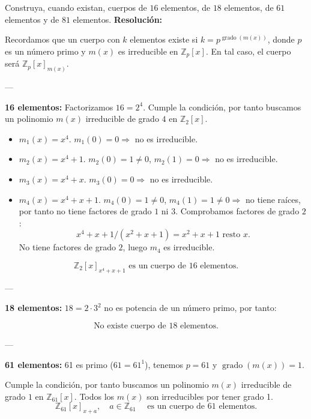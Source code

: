 \documentclass[a4paper,12pt]{article}
\begin{document}
\begin{ejercicio}[title=Ejercicio 60]
Construya, cuando existan, cuerpos de $16$ elementos, de $18$ elementos, de $61$ elementos y de $81$ elementos.
\tcblower
\textbf{Resolución:}

Recordamos que un cuerpo con $k$ elementos existe si $k = p^{\operatorname{grado}(m(x))}$, donde $p$ es un número primo y $m(x)$ es irreducible en $\mathbb{Z}_p[x]$.  
En tal caso, el cuerpo será $\mathbb{Z}_p[x]_{m(x)}$.

---

\textbf{16 elementos:}  
Factorizamos $16 = 2^4$. Cumple la condición, por tanto buscamos un polinomio $m(x)$ irreducible de grado $4$ en $\mathbb{Z}_2[x]$.

\begin{itemize}
\item $m_1(x) = x^4$.  
$m_1(0) = 0 \Rightarrow$ no es irreducible.

\item $m_2(x) = x^4 + 1$.  
$m_2(0) = 1 \neq 0$,  
$m_2(1) = 0 \Rightarrow$ no es irreducible.

\item $m_3(x) = x^4 + x$.  
$m_3(0) = 0 \Rightarrow$ no es irreducible.

\item $m_4(x) = x^4 + x + 1$.  
$m_4(0) = 1 \neq 0$,  
$m_4(1) = 1 \neq 0 \Rightarrow$ no tiene raíces, por tanto no tiene factores de grado $1$ ni $3$.  
Comprobamos factores de grado $2$:
\[
x^4 + x + 1 / (x^2 + x + 1) = x^2 + x + 1 \text{ resto } x.
\]
No tiene factores de grado $2$, luego $m_4$ es irreducible.
\end{itemize}
\[
\boxed{\mathbb{Z}_2[x]_{x^4 + x + 1} \text{ es un cuerpo de } 16 \text{ elementos.}}
\]

---

\textbf{18 elementos:}  
$18 = 2 \cdot 3^2$ no es potencia de un número primo,  
por tanto:

\[
\boxed{\text{No existe cuerpo de 18 elementos.}}
\]

---

\textbf{61 elementos:}  
61 es primo ($61 = 61^1$), tenemos $p = 61$ y $\operatorname{grado}(m(x)) = 1$.

Cumple la condición, por tanto buscamos un polinomio $m(x)$ irreducible de grado $1$ en $\mathbb{Z}_{61}[x]$. Todos los $m(x)$ son irreducibles por tener grado 1.
\[
\boxed{\mathbb{Z}_{61}[x]_{x + a}, \quad a \in \mathbb{Z}_{61} \quad \text{ es un cuerpo de } 61 \text{ elementos.}}
\]


\end{ejercicio}
\end{document}
